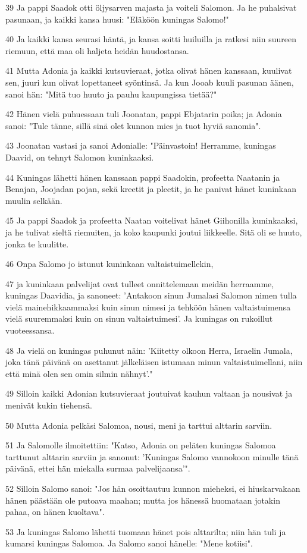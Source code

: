 \par 39 Ja pappi Saadok otti öljysarven majasta ja voiteli Salomon. Ja he puhalsivat pasunaan, ja kaikki kansa huusi: "Eläköön kuningas Salomo!"
\par 40 Ja kaikki kansa seurasi häntä, ja kansa soitti huiluilla ja ratkesi niin suureen riemuun, että maa oli haljeta heidän huudostansa.
\par 41 Mutta Adonia ja kaikki kutsuvieraat, jotka olivat hänen kanssaan, kuulivat sen, juuri kun olivat lopettaneet syöntinsä. Ja kun Jooab kuuli pasunan äänen, sanoi hän: "Mitä tuo huuto ja pauhu kaupungissa tietää?"
\par 42 Hänen vielä puhuessaan tuli Joonatan, pappi Ebjatarin poika; ja Adonia sanoi: "Tule tänne, sillä sinä olet kunnon mies ja tuot hyviä sanomia".
\par 43 Joonatan vastasi ja sanoi Adonialle: "Päinvastoin! Herramme, kuningas Daavid, on tehnyt Salomon kuninkaaksi.
\par 44 Kuningas lähetti hänen kanssaan pappi Saadokin, profeetta Naatanin ja Benajan, Joojadan pojan, sekä kreetit ja pleetit, ja he panivat hänet kuninkaan muulin selkään.
\par 45 Ja pappi Saadok ja profeetta Naatan voitelivat hänet Giihonilla kuninkaaksi, ja he tulivat sieltä riemuiten, ja koko kaupunki joutui liikkeelle. Sitä oli se huuto, jonka te kuulitte.
\par 46 Onpa Salomo jo istunut kuninkaan valtaistuimellekin,
\par 47 ja kuninkaan palvelijat ovat tulleet onnittelemaan meidän herraamme, kuningas Daavidia, ja sanoneet: 'Antakoon sinun Jumalasi Salomon nimen tulla vielä mainehikkaammaksi kuin sinun nimesi ja tehköön hänen valtaistuimensa vielä suuremmaksi kuin on sinun valtaistuimesi'. Ja kuningas on rukoillut vuoteessansa.
\par 48 Ja vielä on kuningas puhunut näin: 'Kiitetty olkoon Herra, Israelin Jumala, joka tänä päivänä on asettanut jälkeläisen istumaan minun valtaistuimellani, niin että minä olen sen omin silmin nähnyt'."
\par 49 Silloin kaikki Adonian kutsuvieraat joutuivat kauhun valtaan ja nousivat ja menivät kukin tiehensä.
\par 50 Mutta Adonia pelkäsi Salomoa, nousi, meni ja tarttui alttarin sarviin.
\par 51 Ja Salomolle ilmoitettiin: "Katso, Adonia on peläten kuningas Salomoa tarttunut alttarin sarviin ja sanonut: 'Kuningas Salomo vannokoon minulle tänä päivänä, ettei hän miekalla surmaa palvelijaansa'".
\par 52 Silloin Salomo sanoi: "Jos hän osoittautuu kunnon mieheksi, ei hiuskarvakaan hänen päästään ole putoava maahan; mutta jos hänessä huomataan jotakin pahaa, on hänen kuoltava".
\par 53 Ja kuningas Salomo lähetti tuomaan hänet pois alttarilta; niin hän tuli ja kumarsi kuningas Salomoa. Ja Salomo sanoi hänelle: "Mene kotiisi".

